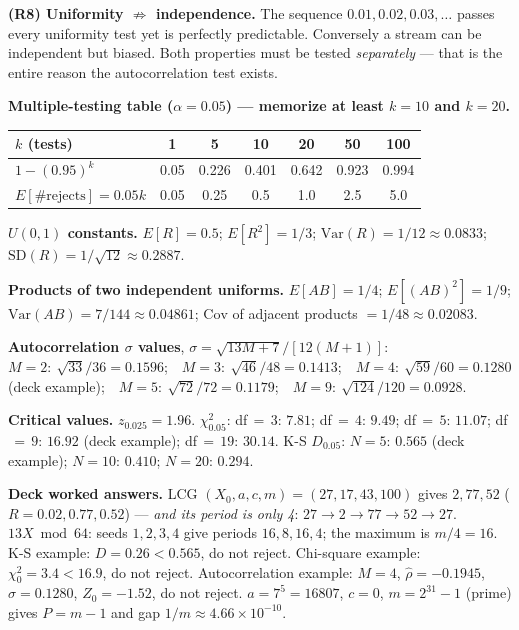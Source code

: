 \begin{derivedbox}
\smallskip
\textbf{(R8) Uniformity $\not\Rightarrow$ independence.} The sequence $0.01,0.02,0.03,\dots$ passes every uniformity test yet is perfectly predictable. Conversely a stream can be independent but biased. Both properties must be tested \emph{separately} --- that is the entire reason the autocorrelation test exists.
\end{derivedbox}

\begin{numbox}
\textbf{Multiple-testing table ($\alpha=0.05$) --- memorize at least $k=10$ and $k=20$.}

\smallskip
\begin{center}\small
\begin{tabular}{lcccccc}
\toprule
$k$ (tests) & 1 & 5 & 10 & 20 & 50 & 100 \\
\midrule
$1-(0.95)^k$ & 0.05 & 0.226 & 0.401 & 0.642 & 0.923 & 0.994 \\
$E[\#\text{rejects}]=0.05k$ & 0.05 & 0.25 & 0.5 & 1.0 & 2.5 & 5.0 \\
\bottomrule
\end{tabular}
\end{center}

\smallskip
\textbf{$U(0,1)$ constants.} $E[R]=0.5$; $E[R^2]=1/3$; $\mathrm{Var}(R)=1/12\approx0.0833$; $\mathrm{SD}(R)=1/\sqrt{12}\approx0.2887$.

\textbf{Products of two independent uniforms.} $E[AB]=1/4$; $E[(AB)^2]=1/9$; $\mathrm{Var}(AB)=7/144\approx0.04861$; $\mathrm{Cov}$ of adjacent products $=1/48\approx0.02083$.

\smallskip
\textbf{Autocorrelation $\sigma$ values}, $\sigma=\sqrt{13M+7}/[12(M+1)]$:
$M{=}2:\ \sqrt{33}/36 = 0.1596$;\ \
$M{=}3:\ \sqrt{46}/48 = 0.1413$;\ \
$M{=}4:\ \sqrt{59}/60 = 0.1280$ (deck example);\ \
$M{=}5:\ \sqrt{72}/72 = 0.1179$;\ \
$M{=}9:\ \sqrt{124}/120 = 0.0928$.

\smallskip
\textbf{Critical values.} $z_{0.025}=1.96$.
$\chi^2_{0.05}$: df$\,{=}\,3\!:\,7.81$; df$\,{=}\,4\!:\,9.49$; df$\,{=}\,5\!:\,11.07$; df$\,{=}\,9\!:\,16.92$ (deck example); df$\,{=}\,19\!:\,30.14$.
K-S $D_{0.05}$: $N{=}5\!:\,0.565$ (deck example); $N{=}10\!:\,0.410$; $N{=}20\!:\,0.294$.

\smallskip
\textbf{Deck worked answers.} LCG $(X_0,a,c,m)=(27,17,43,100)$ gives $2,77,52$ ($R=0.02,0.77,0.52$) --- \emph{and its period is only 4}: $27\to2\to77\to52\to27$.
$13X\bmod64$: seeds $1,2,3,4$ give periods $16,8,16,4$; the maximum is $m/4=16$.
K-S example: $D=0.26 < 0.565$, do not reject.
Chi-square example: $\chi_0^2=3.4 < 16.9$, do not reject.
Autocorrelation example: $M=4$, $\hat\rho=-0.1945$, $\sigma=0.1280$, $Z_0=-1.52$, do not reject.
$a=7^5=16807$, $c=0$, $m=2^{31}-1$ (prime) gives $P=m-1$ and gap $1/m\approx4.66\times10^{-10}$.


\end{numbox}

